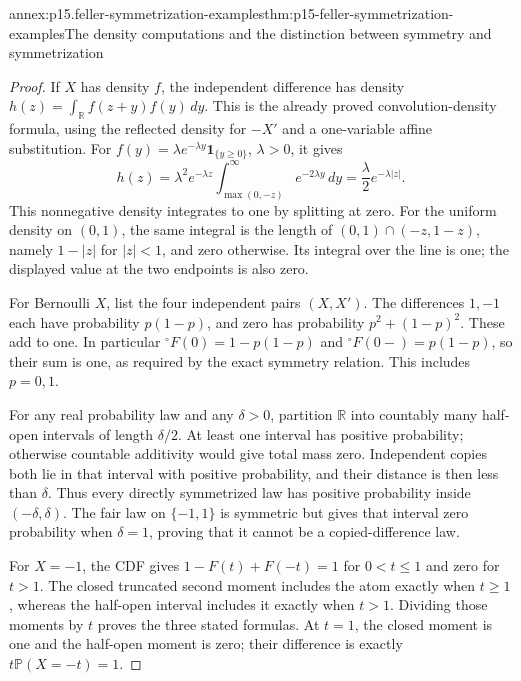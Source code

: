 \begin{annexitem}{annex:p15.feller-symmetrization-examples}{thm:p15-feller-symmetrization-examples}{The density computations and the distinction between symmetry and symmetrization}
\begin{proof}
If \(X\) has density \(f\), the independent difference has density
\(h(z)=\int_{\mathbb R}f(z+y)f(y)\,dy\).
This is the already proved convolution-density formula, using the
reflected density for \(-X'\) and a one-variable affine substitution.
For \(f(y)=\lambda e^{-\lambda y}\mathbf1_{\{y\geq0\}}\),
\(\lambda>0\), it gives
\[
 h(z)=\lambda^2e^{-\lambda z}
       \int_{\max(0,-z)}^\infty e^{-2\lambda y}\,dy
       =\frac{\lambda}{2}e^{-\lambda|z|}.
\]
This nonnegative density integrates to one by splitting at zero.
For the uniform density on \((0,1)\), the same integral is the
length of \((0,1)\cap(-z,1-z)\), namely \(1-|z|\) for
\(|z|<1\), and zero otherwise. Its integral over the line is one;
the displayed value at the two endpoints is also zero.

For Bernoulli \(X\), list the four independent pairs \((X,X')\).
The differences \(1,-1\) each have probability \(p(1-p)\),
and zero has probability \(p^2+(1-p)^2\). These add to one.
In particular
\({}^{\circ}F(0)=1-p(1-p)\) and
\({}^{\circ}F(0-)=p(1-p)\), so their sum is one, as required
by the exact symmetry relation. This includes \(p=0,1\).

For any real probability law and any \(\delta>0\), partition
\(\mathbb R\) into countably many half-open intervals of length
\(\delta/2\). At least one interval has positive probability;
otherwise countable additivity would give total mass zero.
Independent copies both lie in that interval with positive
probability, and their distance is then less than \(\delta\).
Thus every directly symmetrized law has positive probability
inside \((-\delta,\delta)\). The fair law on \(\{-1,1\}\)
is symmetric but gives that interval zero probability when
\(\delta=1\), proving that it cannot be a copied-difference law.

For \(X=-1\), the CDF gives
\(1-F(t)+F(-t)=1\) for \(0<t\leq1\) and zero for \(t>1\).
The closed truncated second moment includes the atom exactly when
\(t\geq1\), whereas the half-open interval includes it exactly
when \(t>1\). Dividing those moments by \(t\) proves the three
stated formulas. At \(t=1\), the closed moment is one and the
half-open moment is zero; their difference is exactly
\(t\mathbb P(X=-t)=1\).
\end{proof}
\end{annexitem}

